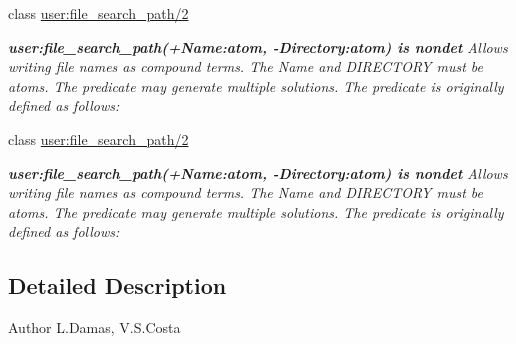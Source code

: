 \begin{DoxyCompactItemize}
class \hyperlink{classuser_1_1file__search__path_22}{user\+:file\+\_\+search\+\_\+path/2}
\begin{DoxyCompactList}\small\item\em {\bfseries  user\+:file\+\_\+search\+\_\+path(+\+Name\+:atom, -\/\+Directory\+:atom) is nondet } Allows writing file names as compound terms. The {\itshape Name} and {\itshape D\+I\+R\+E\+C\+T\+O\+RY} must be atoms. The predicate may generate multiple solutions. The predicate is originally defined as follows\+: \end{DoxyCompactList}\item 
class \hyperlink{classuser_1_1file__search__path_22}{user\+:file\+\_\+search\+\_\+path/2}
\begin{DoxyCompactList}\small\item\em {\bfseries  user\+:file\+\_\+search\+\_\+path(+\+Name\+:atom, -\/\+Directory\+:atom) is nondet } Allows writing file names as compound terms. The {\itshape Name} and {\itshape D\+I\+R\+E\+C\+T\+O\+RY} must be atoms. The predicate may generate multiple solutions. The predicate is originally defined as follows\+: \end{DoxyCompactList}\end{DoxyCompactItemize}


\subsection{Detailed Description}
\begin{DoxyAuthor}{Author}
L.\+Damas, V.\+S.\+Costa 
\end{DoxyAuthor}
